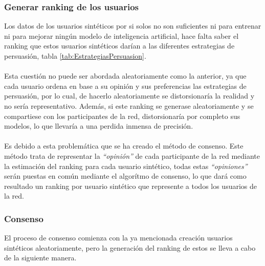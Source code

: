 \subsubsection{Generar ranking de los usuarios}
Los datos de los usuarios sintéticos por si solos no son suficientes ni para entrenar ni para mejorar ningún modelo de inteligencia artificial, hace falta saber el ranking que estos usuarios sintéticos darían a las diferentes estrategias de persuasión, tabla \ref{tab:EstrategiasPersuasion}. 
\\ \\
Esta cuestión no puede ser abordada aleatoriamente como la anterior, ya que cada usuario ordena en base a su opinión y sus preferencias las estrategias de persuasión, por lo cual, de hacerlo aleatoriamente se distorsionaría la realidad y no sería representativo. Además, si este ranking se generase aleatoriamente y se compartiese con los participantes de la red, distorsionaría por completo sus modelos, lo que llevaría a una perdida inmensa de precisión. 
\\ \\
Es debido a esta problemática que se ha creado el método de consenso. Este método trata de representar la \textit{``opinión''} de cada participante de la red mediante la estimación del ranking para cada usuario sintético, todas estas \textit{``opiniones''} serán puestas en común mediante el algorítmo de consenso, lo que dará como resultado un ranking por usuario sintético que represente a todos los usuarios de la red.
\newpage
\subsubsection{Consenso}
El proceso de consenso comienza con la ya mencionada creación usuarios sintéticos aleatoriamente, pero la generación del ranking de estos se lleva a cabo de la siguiente manera.

